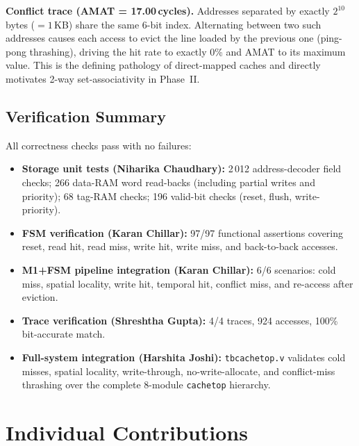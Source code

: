 \documentclass[conference]{IEEEtran}
\renewcommand{\_}{\textunderscore\allowbreak{}}
\begin{document}
\textbf{Conflict trace (AMAT = 17.00\,cycles).}
Addresses separated by exactly $2^{10}$\,bytes ($=1\,$KB) share the
same 6-bit index. Alternating between two such addresses causes each
access to evict the line loaded by the previous one (ping-pong
thrashing), driving the hit rate to exactly 0\% and AMAT to its maximum
value. This is the defining pathology of direct-mapped caches and
directly motivates 2-way set-associativity in Phase~II.

\subsection{Verification Summary}

All correctness checks pass with no failures:
\begin{itemize}
  \item \textbf{Storage unit tests (Niharika Chaudhary):}
        2\,012 address-decoder field checks; 266 data-RAM word read-backs
        (including partial writes and priority); 68 tag-RAM checks; 196
        valid-bit checks (reset, flush, write-priority).
  \item \textbf{FSM verification (Karan Chillar):}
        97/97 functional assertions covering reset, read hit, read miss,
        write hit, write miss, and back-to-back accesses.
  \item \textbf{M1+FSM pipeline integration (Karan Chillar):}
        6/6 scenarios: cold miss, spatial locality, write hit, temporal
        hit, conflict miss, and re-access after eviction.
  \item \textbf{Trace verification (Shreshtha Gupta):}
        4/4 traces, 924 accesses, 100\% bit-accurate match.
  \item \textbf{Full-system integration (Harshita Joshi):}
        \texttt{tb\_cache\_top.v} validates cold misses, spatial locality,
        write-through, no-write-allocate, and conflict-miss thrashing
        over the complete 8-module \texttt{cache\_top} hierarchy.
\end{itemize}

\section{Individual Contributions}
\label{sec:contributions}
\end{document}
